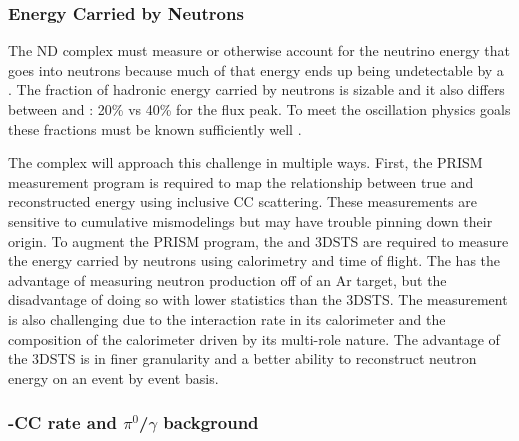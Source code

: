 \subsubsection{Energy Carried by Neutrons}

The ND complex must measure or otherwise account for the neutrino energy that goes into neutrons because much of that energy ends up being undetectable by a . The fraction of hadronic energy carried by neutrons is sizable and it also differs between \numu and \anumu: 20\% vs 40\% for the flux peak. To meet the oscillation physics goals these fractions must be known sufficiently well .

The complex will approach this challenge in multiple ways. First, the PRISM measurement program is required to map the relationship between true and reconstructed energy using inclusive CC scattering. These measurements are sensitive to cumulative mismodelings but may have trouble pinning down their origin. To augment the PRISM program, the  and 3DSTS are required to measure the energy carried by neutrons using calorimetry and time of flight.  The  has the advantage of measuring neutron production off of an Ar target, but the disadvantage of doing so with lower statistics than the 3DSTS. The  measurement is also challenging due to the interaction rate in its calorimeter and the composition of the calorimeter driven by its multi-role nature. The advantage of the 3DSTS is in finer granularity and a better ability to reconstruct neutron energy on an event by event basis.



%







\subsubsection{\nue-CC rate and $\pi^0$/$\gamma$ background}

